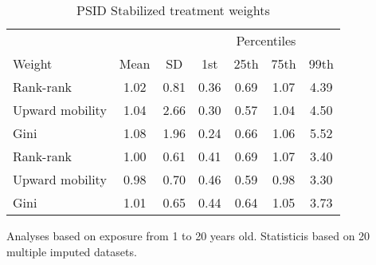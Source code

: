 \begin{table}[htp]
\centering
\footnotesize
\setlength{\tabcolsep}{10pt}
\renewcommand{\arraystretch}{1}
\begin{threeparttable}
\centering
\caption{PSID Stabilized treatment weights} 
\label{tab:psid_r_ipt_weigths}
\begin{tabular}{lcccccc}
  \hline
\multicolumn{3}{c}{} & \multicolumn{4}{c}{Percentiles} \\ 
 \cmidrule{4-7} 
Weight & Mean & SD & 1st & 25th & 75th & 99th \\ 
  \hline
\quad Rank-rank & 1.02 & 0.81 & 0.36 & 0.69 & 1.07 & 4.39 \\ 
  \quad Upward mobility & 1.04 & 2.66 & 0.30 & 0.57 & 1.04 & 4.50 \\ 
  \quad Gini & 1.08 & 1.96 & 0.24 & 0.66 & 1.06 & 5.52 \\ 
  \quad Rank-rank & 1.00 & 0.61 & 0.41 & 0.69 & 1.07 & 3.40 \\ 
  \quad Upward mobility & 0.98 & 0.70 & 0.46 & 0.59 & 0.98 & 3.30 \\ 
  \quad Gini & 1.01 & 0.65 & 0.44 & 0.64 & 1.05 & 3.73 \\ 
   \hline
\end{tabular}
\begin{tablenotes}
\footnotesize
\item Analyses based on exposure from 1 to 20 years old. Statisticis based on  20 multiple imputed datasets.
\end{tablenotes}
\end{threeparttable}
\end{table}

